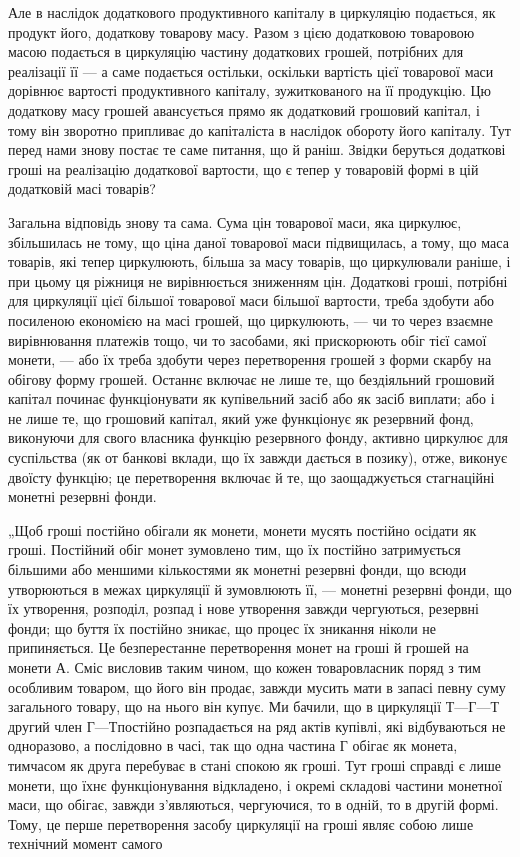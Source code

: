 
Але в наслідок додаткового продуктивного капіталу в циркуляцію
подається, як продукт його, додаткову товарову масу. Разом з цією
додатковою товаровою масою подається в циркуляцію частину додаткових
грошей, потрібних для реалізації її — а саме подається остільки, оскільки
вартість цієї товарової маси дорівнює вартості продуктивного капіталу,
зужиткованого на її продукцію. Цю додаткову масу грошей авансується
прямо як додатковий грошовий капітал, і тому він зворотно припливає
до капіталіста в наслідок обороту його капіталу. Тут перед нами знову
постає те саме питання, що й раніш. Звідки беруться додаткові гроші на
реалізацію додаткової вартости, що є тепер у товаровій формі в цій
додатковій масі товарів?

Загальна відповідь знову та сама. Сума цін товарової маси, яка циркулює,
збільшилась не тому, що ціна даної товарової маси підвищилась,
а тому, що маса товарів, які тепер циркулюють, більша за масу товарів,
що циркулювали раніше, і при цьому ця ріжниця не вирівнюється зниженням
цін. Додаткові гроші, потрібні для циркуляції цієї більшої товарової
маси більшої вартости, треба здобути або посиленою економією на
масі грошей, що циркулюють, — чи то через взаємне вирівнювання платежів
тощо, чи то засобами, які прискорюють обіг тієї самої монети, —
або їх треба здобути через перетворення грошей з форми скарбу на
обігову форму грошей. Останнє включає не лише те, що бездіяльний
грошовий капітал починає функціонувати як купівельний засіб
або як засіб виплати; або і не лише те, що грошовий капітал, який уже
функціонує як резервний фонд, виконуючи для свого власника функцію
резервного фонду, активно циркулює для суспільства (як от банкові
вклади, що їх завжди дається в позику), отже, виконує двоїсту функцію;
це перетворення включає й те, що заощаджується стагнаційні монетні
резервні фонди.

„Щоб гроші постійно обігали як монети, монети мусять постійно
осідати як гроші. Постійний обіг монет зумовлено тим, що їх постійно
затримується більшими або меншими кількостями як монетні резервні
фонди, що всюди утворюються в межах циркуляції й зумовлюють її, —
монетні резервні фонди, що їх утворення, розподіл, розпад і нове утворення
завжди чергуються, резервні фонди; що буття їх постійно зникає,
що процес їх зникання ніколи не припиняється. Це безперестанне перетворення
монет на гроші й грошей на монети А. Сміс висловив таким
чином, що кожен товаровласник поряд з тим особливим товаром, що
його він продає, завжди мусить мати в запасі певну суму загального
товару, що на нього він купує. Ми бачили, що в циркуляції $Т — Г — Т$
другий член $Г — Т п$остійно розпадається на ряд актів купівлі, які відбуваються
не одноразово, а послідовно в часі, так що одна частина Г
обігає як монета, тимчасом як друга перебуває в стані спокою як гроші.
Тут гроші справді є лише монети, що їхнє функціонування відкладено,
і окремі складові частини монетної маси, що обігає, завжди з’являються,
чергуючися, то в одній, то в другій формі. Тому, це перше перетворення
засобу циркуляції на гроші являє собою лише технічний момент самого
\parbreak{}  %
